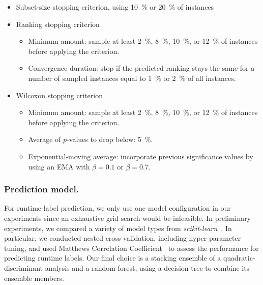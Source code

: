 \documentclass[runningheads]{llncs}
\begin{document}
\begin{itemize}
  \item Subset-size stopping criterion, using \SI{10}{\%} or \SI{20}{\%} of instances
  \item Ranking stopping criterion
  \begin{itemize}
    \item Minimum amount: sample at least \SI{2}{\%}, \SI{8}{\%}, \SI{10}{\%}, or \SI{12}{\%} of instances before applying the criterion.
    \item Convergence duration: stop if the predicted ranking stays the same for a number of sampled instances equal to \SI{1}{\%} or \SI{2}{\%} of all instances.
  \end{itemize}

  \item Wilcoxon stopping criterion
  \begin{itemize}
    \item Minimum amount: sample at least \SI{2}{\%}, \SI{8}{\%}, \SI{10}{\%}, or \SI{12}{\%} of instances before applying the criterion.
    \item Average of $p$-values to drop below: \SI{5}{\%}.
    \item Exponential-moving average: incorporate previous significance values by using an EMA with $\beta = 0.1$ or $\beta = 0.7$.
  \end{itemize}
\end{itemize}

\subsubsection{Prediction model.}

For runtime-label prediction, we only use one model configuration in our experiments since an exhaustive grid search would be infeasible.
In preliminary experiments, we compared a variety of model types from \emph{scikit-learn}~\cite{scikit-learn}.
In particular, we conducted nested cross-validation, including hyper-parameter tuning, and used Matthews Correlation Coefficient~\cite{gorodkin2004comparing,matthews1975comparison} to assess the performance for predicting runtime labels.
Our final choice is a stacking ensemble of a quadratic-discriminant analysis and a random forest, using a decision tree to combine its ensemble members.
\end{document}
